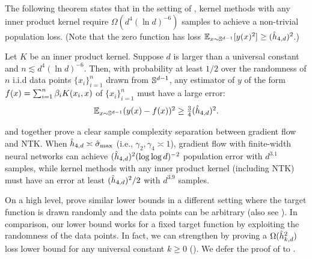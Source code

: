 The following theorem states that in the setting of , kernel methods with any inner product kernel require $\Omega(d^4(\ln d)^{-6})$ samples to achieve a non-trivial population loss. (Note that the zero function has loss $\operatorname*{\mathbb{E}}_{x\sim \mathbb{S}^{d-1}}[y(x)^2]\ge (\hat{h}_{4, d})^2$.)
\begin{theorem}\label{thm:lb-main}
Let  $K$ be an inner product kernel. Suppose $d$ is larger than a universal constant and $n\lesssim d^4(\ln d)^{-6}$. 
Then, with probability at least $1/2$ over the randomness of $n$ i.i.d data points $\{x_i\}_{i=1}^n$ drawn from $\mathbb{S}^{d-1}$, any estimator of $y$ of the form $f(x)=\sum_{i=1}^{n}\beta_i K(x_i,x)$ of $\{x_i\}_{i=1}^{n}$ must have a large error: 
\begin{align}
\textstyle{\operatorname*{\mathbb{E}}_{x\sim \mathbb{S}^{d-1}}(y(x)-f(x))^2\ge \frac{3}{4}(\hat{h}_{4, d})^2.}
\end{align}
\end{theorem}

 and  together prove a clear sample complexity separation between gradient flow and NTK.
When $\hat{h}_{4, d}\asymp \hat{\sigma}_{\textup{max}}$ (i.e., $\gamma_2,\gamma_4\asymp 1$),
gradient flow with finite-width neural networks can achieve $(\hat{h}_{4, d})^2(\log\log d)^{-2}$ population error with $d^{3.1}$ samples, while kernel methods with any inner product kernel (including NTK) must have an error at least $(\hat{h}_{4, d})^2/2$ with $d^{3.9}$ samples.

On a high level, \citet{abbe2022merged,abbe2023sgd} prove similar lower bounds in a different setting where the target function is drawn randomly and the data points can be arbitrary (also see \citet{kamath2020approximate,hsu2021approximation,hsu2021dimension}). In comparison, our lower bound works for a fixed target function by exploiting the randomness of the data points. In fact, we can strengthen  by proving a $\Omega(\hat{h}_{k, d}^{2})$ loss lower bound for any universal constant $k\ge 0$ (). We defer the proof of  to .







